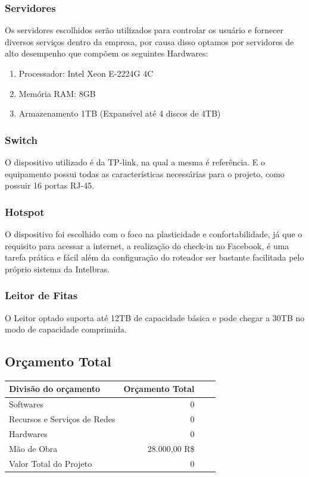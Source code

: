\documentclass[12pt]{article}
\begin{document}
\subsubsection{Servidores}
Os servidores escolhidos serão utilizados para controlar os usuário e fornecer diversos serviços dentro da empresa, por causa disso optamos por servidores de alto desempenho que compõem os seguintes Hardwares:
\begin{enumerate}
    \item Processador: Intel Xeon E-2224G 4C
    \item Memória RAM: 8GB
    \item Armazenamento 1TB (Expansível até 4 discos de 4TB)
\end{enumerate}
\subsubsection{Switch}
O dispositivo utilizado é da TP-link, na qual a mesma é referência. E o equipamento possui todas as características necessárias para o projeto, como possuir 16 portas RJ-45.
\subsubsection{Hotspot}
O dispositivo foi escolhido com o foco na plasticidade e confortabilidade, já que o requisito para acessar a internet, a realização do check-in no Facebook, é uma tarefa prática e fácil além da configuração do roteador ser bastante facilitada pelo próprio sistema da Intelbras.
\subsubsection{Leitor de Fitas}
O Leitor optado suporta até 12TB de capacidade básica e pode chegar a 30TB no modo de capacidade comprimida.
\subsection{Orçamento Total}
\begin{center}
\begin{tabular}{| l | r | r | r |}
\hline 
Divisão do orçamento & Orçamento Total\\
\hline
Softwares & 0\\
Recursos e Serviços de Redes & 0\\
Hardwares & 0\\
Mão de Obra & 28.000,00 R\$\\
Valor Total do Projeto & 0\\
\hline
\end{tabular}
\end{center}
\end{document}
